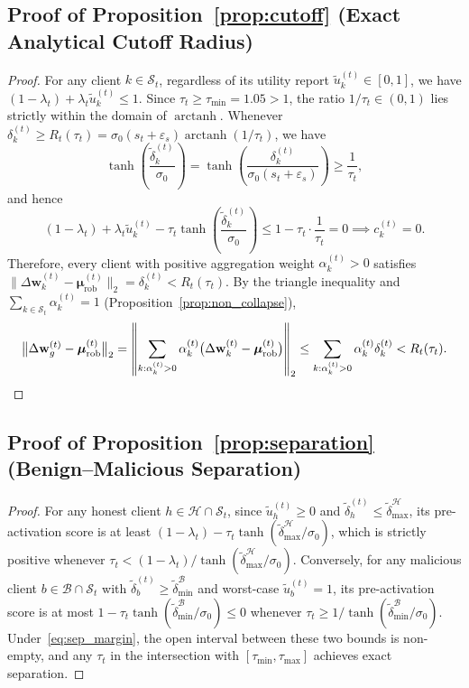 \subsection{Proof of Proposition~\ref{prop:cutoff} (Exact Analytical Cutoff Radius)}
\begin{proof}
For any client $k \in \mathcal{S}_t$, regardless of its utility report $\tilde{u}_k^{(t)} \in [0, 1]$, we have $(1 - \lambda_t) + \lambda_t \tilde{u}_k^{(t)} \le 1$. Since $\tau_t \ge \tau_{\min} = 1.05 > 1$, the ratio $1/\tau_t \in (0, 1)$ lies strictly within the domain of $\operatorname{arctanh}$. Whenever $\delta_k^{(t)} \ge R_t(\tau_t) = \sigma_0 (s_t + \varepsilon_s) \operatorname{arctanh}(1/\tau_t)$, we have
\[
\tanh\!\left(\frac{\tilde{\delta}_k^{(t)}}{\sigma_0}\right) = \tanh\!\left(\frac{\delta_k^{(t)}}{\sigma_0(s_t+\varepsilon_s)}\right) \ge \frac{1}{\tau_t},
\]
and hence
\[
(1 - \lambda_t) + \lambda_t \tilde{u}_k^{(t)} - \tau_t \tanh\!\left(\frac{\tilde{\delta}_k^{(t)}}{\sigma_0}\right) \le 1 - \tau_t \cdot \frac{1}{\tau_t} = 0 \implies c_k^{(t)} = 0.
\]
Therefore, every client with positive aggregation weight $\alpha_k^{(t)} > 0$ satisfies $\|\Delta\mathbf{w}_k^{(t)} - \boldsymbol{\mu}_{\mathrm{rob}}^{(t)}\|_2 = \delta_k^{(t)} < R_t(\tau_t)$. By the triangle inequality and $\sum_{k\in\mathcal{S}_t} \alpha_k^{(t)} = 1$ (Proposition~\ref{prop:non_collapse}),
\[
\big\|\Delta\mathbf{w}_g^{(t)} - \boldsymbol{\mu}_{\mathrm{rob}}^{(t)}\big\|_2
= \left\|\sum_{k:\alpha_k^{(t)}>0} \alpha_k^{(t)}\big(\Delta\mathbf{w}_k^{(t)} - \boldsymbol{\mu}_{\mathrm{rob}}^{(t)}\big)\right\|_2
\le \sum_{k:\alpha_k^{(t)}>0} \alpha_k^{(t)} \delta_k^{(t)} < R_t(\tau_t). \qedhere
\]
\end{proof}

\subsection{Proof of Proposition~\ref{prop:separation} (Benign--Malicious Separation)}
\begin{proof}
For any honest client $h \in \mathcal{H}\cap\mathcal{S}_t$, since $\tilde{u}_h^{(t)} \ge 0$ and $\tilde{\delta}_h^{(t)} \le \tilde{\delta}_{\max}^{\mathcal{H}}$, its pre-activation score is at least $(1 - \lambda_t) - \tau_t \tanh(\tilde{\delta}_{\max}^{\mathcal{H}} / \sigma_0)$, which is strictly positive whenever $\tau_t < (1 - \lambda_t) / \tanh(\tilde{\delta}_{\max}^{\mathcal{H}} / \sigma_0)$. Conversely, for any malicious client $b \in \mathcal{B}\cap\mathcal{S}_t$ with $\tilde{\delta}_b^{(t)} \ge \tilde{\delta}_{\min}^{\mathcal{B}}$ and worst-case $\tilde{u}_b^{(t)} = 1$, its pre-activation score is at most $1 - \tau_t \tanh(\tilde{\delta}_{\min}^{\mathcal{B}} / \sigma_0) \le 0$ whenever $\tau_t \ge 1 / \tanh(\tilde{\delta}_{\min}^{\mathcal{B}} / \sigma_0)$. Under~\eqref{eq:sep_margin}, the open interval between these two bounds is non-empty, and any $\tau_t$ in the intersection with $[\tau_{\min}, \tau_{\max}]$ achieves exact separation.
\end{proof}

